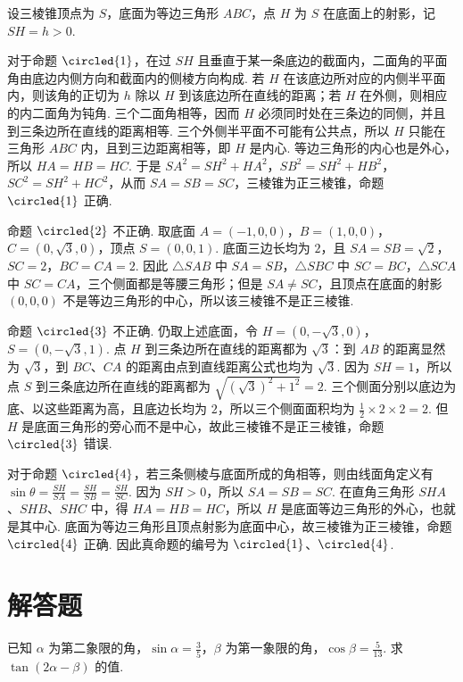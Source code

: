 \begin{solution}
设三棱锥顶点为 \(S\)，底面为等边三角形 \(ABC\)，点 \(H\) 为 \(S\) 在底面上的射影，记 \(SH=h>0\).

对于命题 \(\circled{1}\)，在过 \(SH\) 且垂直于某一条底边的截面内，二面角的平面角由底边内侧方向和截面内的侧棱方向构成. 若 \(H\) 在该底边所对应的内侧半平面内，则该角的正切为 \(h\) 除以 \(H\) 到该底边所在直线的距离；若 \(H\) 在外侧，则相应的内二面角为钝角. 三个二面角相等，因而 \(H\) 必须同时处在三条边的同侧，并且到三条边所在直线的距离相等. 三个外侧半平面不可能有公共点，所以 \(H\) 只能在三角形 \(ABC\) 内，且到三边距离相等，即 \(H\) 是内心. 等边三角形的内心也是外心，所以 \(HA=HB=HC\). 于是 \(SA^{2}=SH^{2}+HA^{2}\)，\(SB^{2}=SH^{2}+HB^{2}\)，\(SC^{2}=SH^{2}+HC^{2}\)，从而 \(SA=SB=SC\)，三棱锥为正三棱锥，命题 \(\circled{1}\) 正确.

命题 \(\circled{2}\) 不正确. 取底面 \(A=(-1,0,0)\)，\(B=(1,0,0)\)，\(C=(0,\sqrt3,0)\)，顶点 \(S=(0,0,1)\). 底面三边长均为 \(2\)，且 \(SA=SB=\sqrt2\)，\(SC=2\)，\(BC=CA=2\). 因此 \(\triangle SAB\) 中 \(SA=SB\)，\(\triangle SBC\) 中 \(SC=BC\)，\(\triangle SCA\) 中 \(SC=CA\)，三个侧面都是等腰三角形；但是 \(SA\ne SC\)，且顶点在底面的射影 \((0,0,0)\) 不是等边三角形的中心，所以该三棱锥不是正三棱锥.

命题 \(\circled{3}\) 不正确. 仍取上述底面，令 \(H=(0,-\sqrt3,0)\)，\(S=(0,-\sqrt3,1)\). 点 \(H\) 到三条边所在直线的距离都为 \(\sqrt3\)：到 \(AB\) 的距离显然为 \(\sqrt3\)，到 \(BC\)、\(CA\) 的距离由点到直线距离公式也均为 \(\sqrt3\). 因为 \(SH=1\)，所以点 \(S\) 到三条底边所在直线的距离都为 \(\sqrt{(\sqrt3)^{2}+1^{2}}=2\). 三个侧面分别以底边为底、以这些距离为高，且底边长均为 \(2\)，所以三个侧面面积均为 \(\frac12\times2\times2=2\). 但 \(H\) 是底面三角形的旁心而不是中心，故此三棱锥不是正三棱锥，命题 \(\circled{3}\) 错误.

对于命题 \(\circled{4}\)，若三条侧棱与底面所成的角相等，则由线面角定义有 \(\sin\theta=\frac{SH}{SA}=\frac{SH}{SB}=\frac{SH}{SC}\). 因为 \(SH>0\)，所以 \(SA=SB=SC\). 在直角三角形 \(SHA\)、\(SHB\)、\(SHC\) 中，得 \(HA=HB=HC\)，所以 \(H\) 是底面等边三角形的外心，也就是其中心. 底面为等边三角形且顶点射影为底面中心，故三棱锥为正三棱锥，命题 \(\circled{4}\) 正确. 因此真命题的编号为 \(\circled{1}\)、\(\circled{4}\).
\end{solution}

\section{解答题}

\begin{problem}
已知 \(\alpha\) 为第二象限的角，\(\sin \alpha = \frac{3}{5}\)，\(\beta\) 为第一象限的角，\(\cos \beta = \frac{5}{13}\). 求 \(\tan (2\alpha - \beta)\) 的值.
\end{problem}

